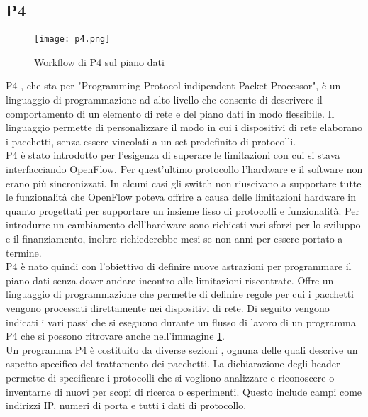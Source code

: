\subsection{P4}
\begin{figure}[h]
    \centering
   \texttt{[image: p4.png]}
    \caption{Workflow di P4 sul piano dati \cite{p4Article}}
    \label{fig:p4}
\end{figure}
P4 \cite{p4}, che sta per "Programming Protocol-indipendent Packet Processor",  è un linguaggio di programmazione ad alto livello che consente di descrivere il comportamento di un elemento di rete e del piano dati in modo flessibile.
Il linguaggio permette di personalizzare il modo in cui i dispositivi di rete elaborano i pacchetti, senza essere vincolati a un set predefinito di protocolli.
\\P4 è stato introdotto per l'esigenza di superare le limitazioni con cui si stava interfacciando OpenFlow.
Per quest'ultimo protocollo l'hardware e il software non erano più sincronizzati. In alcuni casi 
gli switch non riuscivano a supportare tutte le funzionalità che OpenFlow poteva offrire a causa delle limitazioni hardware in quanto progettati per supportare un insieme fisso di protocolli e funzionalità. 
Per introdurre un cambiamento dell'hardware sono richiesti vari sforzi per lo sviluppo e il finanziamento, inoltre richiederebbe mesi se non anni per essere portato a termine.
\\P4 è nato quindi con l'obiettivo di definire nuove astrazioni per programmare il piano dati senza dover andare incontro alle limitazioni riscontrate.
Offre un linguaggio di programmazione che permette di definire regole per cui i pacchetti vengono processati direttamente nei dispositivi di rete.
Di seguito vengono indicati i vari passi che si eseguono durante un flusso di lavoro di un programma P4 che si possono ritrovare anche nell'immagine \ref{fig:p4}.
\\Un programma P4 è costituito da diverse sezioni \cite{p4Article}, ognuna delle quali descrive un aspetto specifico del trattamento dei pacchetti.
La dichiarazione degli header permette di specificare i protocolli che si vogliono analizzare e riconoscere o inventarne di nuovi per scopi di ricerca o esperimenti.
Questo include campi come indirizzi IP, numeri di porta e tutti i dati di protocollo.
